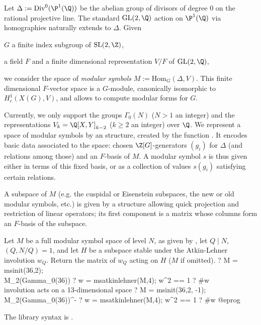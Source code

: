 Let $\Delta := \text{Div}^0(\P^1(\Q))$ be the abelian group of divisors of
degree $0$ on the rational projective line. The standard $\text{GL}(2,\Q)$
action on $\P^1(\Q)$ via homographies naturally extends to $\Delta$. Given

\item $G$ a finite index subgroup of $\text{SL}(2,\Z)$,

\item a field $F$ and a finite dimensional representation $V/F$ of
  $\text{GL}(2,\Q)$,

\noindent we consider the space of \emph{modular symbols} $M :=
\text{Hom}_G(\Delta, V)$. This finite dimensional $F$-vector
space is a $G$-module, canonically isomorphic to $H^1_c(X(G), V)$,
and allows to compute modular forms for $G$.

Currently, we only support the groups $\Gamma_0(N)$ ($N > 1$ an integer)
and the representations $V_k = \Q[X,Y]_{k-2}$ ($k \geq 2$ an integer) over
$\Q$. We represent a space of modular symbols by an  structure,
created by the function . It encodes basic data associated to the
space: chosen $\Z[G]$-generators $(g_i)$ for $\Delta$ (and relations among
those) and an $F$-basis of $M$. A modular symbol $s$ is thus given either in
terms of this fixed basis, or as a collection of values $s(g_i)$
satisfying certain relations.

A subspace of $M$ (e.g. the cuspidal or Eisenstein subspaces, the new or
old modular symbols, etc.) is given by a structure allowing quick projection
and restriction of linear operators; its first component is a matrix whose
columns  form  an $F$-basis  of the subspace.


\label{se:msatkinlehner}
Let $M$ be a full modular symbol space of level $N$,
as given by , let $Q \mid N$, $(Q,N/Q) = 1$,
and let $H$ be a subspace stable under the Atkin-Lehner involution $w_Q$.
Return the matrix of $w_Q$ acting on $H$ ($M$ if omitted).
\bprog
? M = msinit(36,2); \\ M_2(Gamma_0(36))
? w = msatkinlehner(M,4); w^2 == 1
? #w   \\ involution acts on a 13-dimensional space
? M = msinit(36,2, -1); \\ M_2(Gamma_0(36))^-
? w = msatkinlehner(M,4); w^2 == 1
? #w
@eprog

The library syntax is .

